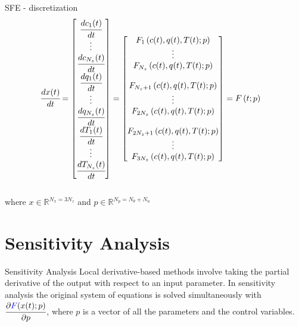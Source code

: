 \documentclass[8pt]{beamer}
\begin{document}
	\begin{frame}[fragile]{SFE - discretization}
		\small{
		\begin{align*}
			\cfrac{d x(t)}{d t} &= 
			\begin{bmatrix}
				\cfrac{d c_1(t)}{d t} 	  \\
				\vdots					  \\
				\cfrac{d c_{N_z}(t)}{d t} \\
				\cfrac{d q_1(t)}{d t} 	  \\
				\vdots					  \\
				\cfrac{d q_{N_z}(t)}{d t} \\
				\cfrac{d T_1(t)}{d t} 	  \\
				\vdots 					  \\
				\cfrac{d T_{N_z}(t)}{d t}
			\end{bmatrix}
			=
			\begin{bmatrix}
				F_1 \left( c(t),q(t),T(t); p \right)\\ 
				\vdots\\ 
				F_{N_z} \left( c(t),q(t),T(t); p \right)\\ \\
				F_{N_z+1} \left( c(t),q(t),T(t); p \right)\\
				\vdots\\
				F_{2N_z} \left( c(t),q(t),T(t); p \right)\\ \\
				F_{2N_z+1} \left( c(t),q(t),T(t); p \right) \\
				\vdots\\
				F_{3N_z} \left( c(t),q(t),T(t); p \right)
			\end{bmatrix}
			= F \left( t; p \right)
		\end{align*} }\\
		where $x \in \mathbb{R}^{N_x = 3N_z} $ and $p \in \mathbb{R}^{N_p =  N_{\theta} + N_u } $
	\end{frame}
	
	\section{Sensitivity Analysis}
	
	\begin{frame}[fragile]{Sensitivity Analysis}
		Local derivative-based methods involve taking the partial derivative of the output with respect to an input parameter. In sensitivity analysis the original system of equations is solved simultaneously with $\cfrac{\partial \textcolor{blue}{F}(x(t);p)}{\partial p}$, where $p$ is a vector of all the parameters and the control variables.
	\end{frame}
\end{document}
